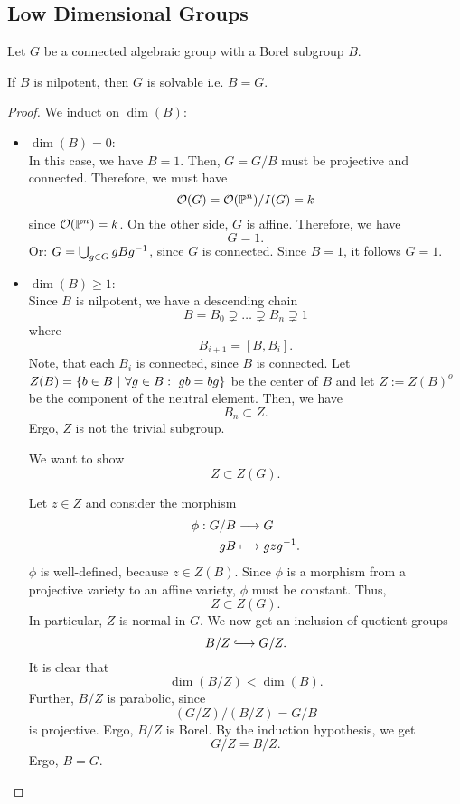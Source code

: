 \subsection{Low Dimensional Groups}
\begin{lemma}
	Let $G$ be a connected algebraic group with a Borel subgroup $B$.
	
If $B$ is nilpotent, then $G$ is solvable i.e. $B = G$.
\end{lemma}
\begin{proof}
	We induct on $\dim(B)$:
	\begin{itemize}
		\item $\dim(B) = 0$:\\
		In this case, we have $B = 1$. Then, $G=G/B$ must be projective and connected. Therefore, we must have
		\[ \mathcal{O}(G) = \mathcal{O}(\mathbb{P}^n) / I(G) = k \]
		since $\mathcal{O}(\mathbb{P}^n) = k$. On the other side, $G$ is affine. Therefore, we have
		\[ G = 1. \]
		Or: $G = \bigcup_{g\in G} gBg^{-1}$, since $G$ is connected. Since $B = 1$, it follows $G = 1$.
		\item $\dim(B) \geq 1$:\\
		Since $B$ is nilpotent, we have a descending chain
		\[ B = B_0 \supsetneq \ldots \supsetneq B_n \supsetneq 1 \]
		where
		\[ B_{i+1} = [B, B_i]. \]
		Note, that each $B_i$ is connected, since $B$ is connected.
		Let $Z(B) = \left\lbrace b \in B ~ | ~ \forall g \in B:~ gb=bg\right\rbrace$ be the center of $B$ and let $Z:= Z(B)^o$ be the component of the neutral element. Then, we have
		\[ B_{n} \subset Z.  \]
		Ergo, $Z$ is not the trivial subgroup.
		
		We want to show
		\[ Z \subset Z(G). \]
		
		Let $z \in Z$ and consider the morphism
		\begin{align*}
		\phi : G/B & \overset{}{\longrightarrow} G\\
		gB & \longmapsto gzg^{-1}.
		\end{align*}
		$\phi$ is well-defined, because $z \in Z(B)$. Since $\phi$ is a morphism from a projective variety to an affine variety, $\phi$ must be constant. Thus,
		\[ Z \subset Z(G). \]
		In particular, $Z$ is normal in $G$. We now get an inclusion of quotient groups
		\[ B/Z \Inj{} G/Z. \]
		It is clear that
		\[ \dim(B/Z) < \dim(B). \]
		Further, $B/Z$ is parabolic, since
		\[ (G/Z) / (B/Z) = G/B \]
		is projective. Ergo, $B/Z$ is Borel. By the induction hypothesis, we get
		\[ G/Z = B/Z. \]
		Ergo, $B = G$.
	\end{itemize}
\end{proof}

